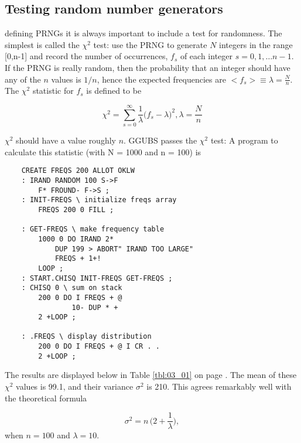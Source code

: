 \subsection{Testing random number generators}
defining PRNGs it is always important to include a test for randomness. The simplest is called the $\chi^2$ test: use the PRNG to generate $N$ integers in the range [0,n-1] and record the number of occurrences, $f_s$ of each integer $s = 0, 1, \dots n-1$. If the PRNG is really random, then the probability that an integer should have any of the $n$ values is $1/n$, hence the expected frequencies are $<f_s> \equiv \lambda = \frac{N}{n}$. The $\chi^2$ statistic for $f_s$ is defined to be

\begin{equation}
    \chi^2=\sum_{s=0}^{\infty}\frac{1}{\lambda}\Big(f_s-\lambda\Big)^2, \lambda=\frac{N}{n} %
\end{equation}


$\chi^2$ should have a value roughly $n$. GGUBS passes the $\chi^2$ test: A program to calculate this statistic (with N = 1000 and n = 100) is

\begin{lstlisting}
    CREATE FREQS 200 ALLOT OKLW
    : IRAND RANDOM 100 S->F
        F* FROUND- F->S ;
    : INIT-FREQS \ initialize freqs array
        FREQS 200 0 FILL ;

    : GET-FREQS \ make frequency table
        1000 0 DO IRAND 2*
            DUP 199 > ABORT" IRAND TOO LARGE"
            FREQS + 1+!
        LOOP ;
    : START.CHISQ INIT-FREQS GET-FREQS ;
    : CHISQ 0 \ sum on stack
        200 0 DO I FREQS + @
                10- DUP * +
        2 +LOOP ;

    : .FREQS \ display distribution
        200 0 DO I FREQS + @ I CR . . 
        2 +LOOP ;
\end{lstlisting}

The results are displayed below in Table \ref{tbl:03_01} on page \pageref{tbl:03_01}. The mean of these $\chi^2$ values is 99.1, and their variance $\sigma^2$ is 210. This agrees remarkably well with the theoretical formula

\begin{equation*}
    \sigma^2=n \, \Big(2+\frac{1}{\lambda}\Big),
\end{equation*}
when $n = 100$ and $\lambda = 10$.

 
